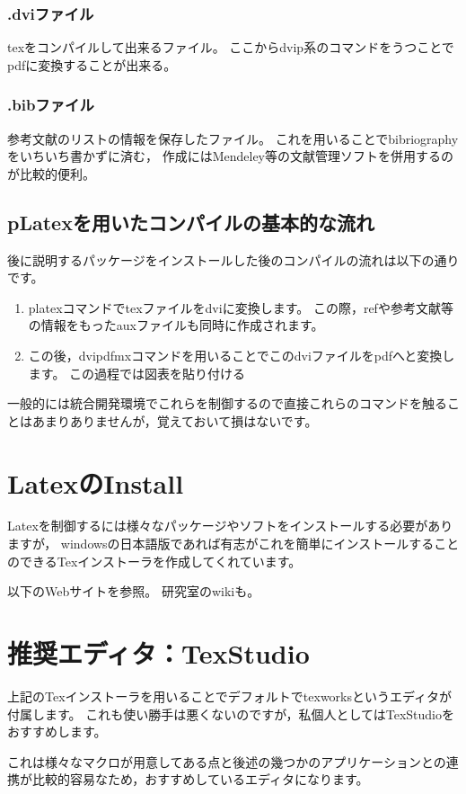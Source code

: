 \documentclass[a4paper,10pt,twocolumn,fleqn]{jarticle}
\begin{document}
\subsubsection*{.dviファイル}
texをコンパイルして出来るファイル。
ここからdvip系のコマンドをうつことでpdfに変換することが出来る。
\subsubsection*{.bibファイル}
参考文献のリストの情報を保存したファイル。
これを用いることでbibriographyをいちいち書かずに済む，
作成にはMendeley等の文献管理ソフトを併用するのが比較的便利。

\subsection{pLatexを用いたコンパイルの基本的な流れ}
後に説明するパッケージをインストールした後のコンパイルの流れは以下の通りです。
\begin{enumerate}
\item platexコマンドでtexファイルをdviに変換します。
この際，refや参考文献等の情報をもったauxファイルも同時に作成されます。

\item この後，dvipdfmxコマンドを用いることでこのdviファイルをpdfへと変換します。
この過程では図表を貼り付ける
\end{enumerate}
一般的には統合開発環境でこれらを制御するので直接これらのコマンドを触ることはあまりありませんが，覚えておいて損はないです。

\section{LatexのInstall}
Latexを制御するには様々なパッケージやソフトをインストールする必要がありますが，
windowsの日本語版であれば有志がこれを簡単にインストールすることのできるTexインストーラを作成してくれています。

以下のWebサイトを参照。
研究室のwikiも。


\section{推奨エディタ：TexStudio}
上記のTexインストーラを用いることでデフォルトでtexworksというエディタが付属します。
これも使い勝手は悪くないのですが，私個人としてはTexStudioをおすすめします。

これは様々なマクロが用意してある点と後述の幾つかのアプリケーションとの連携が比較的容易なため，おすすめしているエディタになります。
\end{document}
